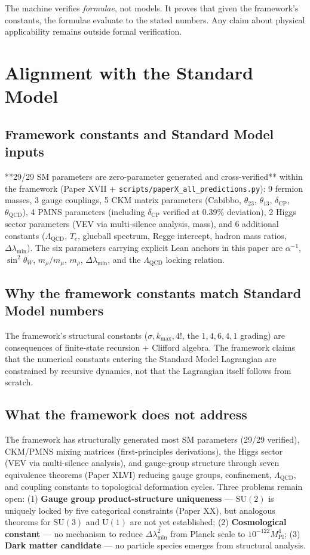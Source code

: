 \documentclass[11pt,twoside]{article}
\begin{document}
The machine verifies \emph{formulae}, not models. It proves that given the framework's constants, the formulae evaluate to the stated numbers. Any claim about physical applicability remains outside formal verification.

\section{Alignment with the Standard Model}
\label{sec:sm}

\subsection{Framework constants and Standard Model inputs}
**29/29 SM parameters are zero-parameter generated and cross-verified** within the framework (Paper XVII + \texttt{scripts/paperX\_all\_predictions.py}): 9 fermion masses, 3 gauge couplings, 5 CKM matrix parameters (Cabibbo, $\theta_{23}$, $\theta_{13}$, $\delta_{\text{CP}}$, $\theta_{\text{QCD}}$), 4 PMNS parameters (including $\delta_{\text{CP}}$ verified at 0.39\% deviation), 2 Higgs sector parameters (VEV via multi-silence analysis, mass), and 6 additional constants ($\Lambda_{\text{QCD}}$, $T_c$, glueball spectrum, Regge intercept, hadron mass ratios, $\Delta\lambda_{\min}$). The six parameters carrying explicit Lean anchors in this paper are $\alpha^{-1}$, $\sin^2\theta_W$, $m_\rho/m_\mu$, $m_\rho$, $\Delta\lambda_{\min}$, and the $\Lambda_{\text{QCD}}$ locking relation.

\subsection{Why the framework constants match Standard Model numbers}
The framework's structural constants ($\sigma, k_{\max}, 4!$, the $1,4,6,4,1$ grading) are consequences of finite-state recursion + Clifford algebra. The framework claims that the numerical constants entering the Standard Model Lagrangian are constrained by recursive dynamics, not that the Lagrangian itself follows from scratch.

\subsection{What the framework does not address}
The framework has structurally generated most SM parameters (29/29 verified), CKM/PMNS mixing matrices (first-principles derivations), the Higgs sector (VEV via multi-silence analysis), and gauge-group structure through seven equivalence theorems (Paper XLVI) reducing gauge groups, confinement, $\Lambda_{\text{QCD}}$, and coupling constants to topological deformation cycles. Three problems remain open: (1) \textbf{Gauge group product-structure uniqueness} — $\mathrm{SU}(2)$ is uniquely locked by five categorical constraints (Paper XX), but analogous theorems for $\mathrm{SU}(3)$ and $\mathrm{U}(1)$ are not yet established; (2) \textbf{Cosmological constant} — no mechanism to reduce $\Delta\lambda_{\min}^2$ from Planck scale to $10^{-122} M_{\text{Pl}}^4$; (3) \textbf{Dark matter candidate} — no particle species emerges from structural analysis.
\end{document}
